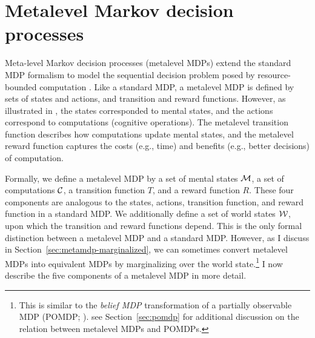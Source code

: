 \section{Metalevel Markov decision processes}\label{sec:metalevel-mdps}


Meta-level Markov decision processes (metalevel MDPs) extend the standard MDP formalism to model the sequential decision problem posed by resource-bounded computation \citep{hay2012selecting}. Like a standard MDP, a metalevel MDP is defined by sets of states and actions, and transition and reward functions. However, as illustrated in , the states corresponded to mental states, and the actions correspond to computations (cognitive operations). The metalevel transition function describes how computations update mental states, and the metalevel reward function captures the costs (e.g., time) and benefits (e.g., better decisions) of computation.

Formally, we define a metalevel MDP by a set of mental states $\mathcal{M}$, a set of computations $\mathcal{C}$, a transition function $T$, and a reward function $R$. These four components are analogous to the states, actions, transition function, and reward function in a standard MDP. We additionally define a set of world states $\mathcal{W}$, upon which the transition and reward functions depend. This is the only formal distinction between a metalevel MDP and a standard MDP. However, as I discuss in Section~\ref{sec:metamdp-marginalized}, we can sometimes convert metalevel MDPs into equivalent MDPs by marginalizing over the world state.\footnote{%
  This is similar to the \emph{belief MDP} transformation of a partially observable MDP (POMDP; \citealp{kaelbling1998planningb}). see Section~\ref{sec:pomdp} for additional discussion on the relation between metalevel MDPs and POMDPs.
} I now describe the five components of a metalevel MDP in more detail.



